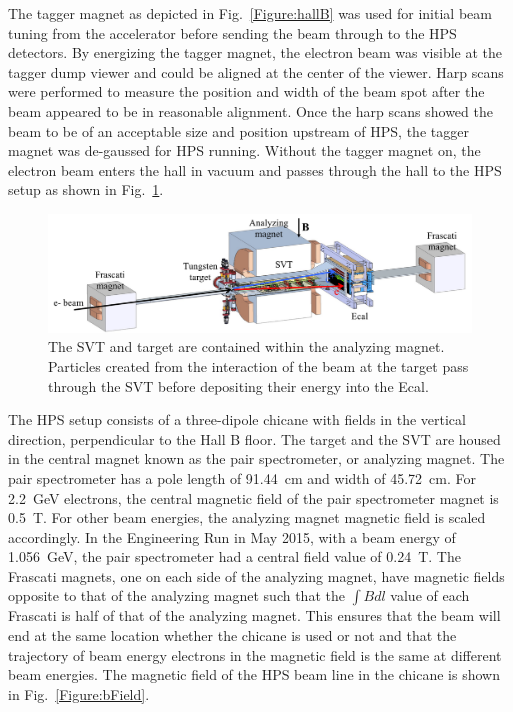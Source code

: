 \documentclass[12pt]{report}
\begin{document}
The tagger magnet as depicted in Fig.~\ref{Figure:hallB} was used for initial beam tuning from the accelerator before sending the beam through to the HPS detectors. By energizing the tagger magnet, the electron beam was visible at the tagger dump viewer and could be aligned at the center of the viewer. Harp scans were performed to measure the position and width of the beam spot after the beam appeared to be in reasonable alignment. Once the harp scans showed the beam to be of an acceptable size and position upstream of HPS, the tagger magnet was de-gaussed for HPS running. Without the tagger magnet on, the electron beam enters the hall in vacuum and passes through the hall to the HPS setup as shown in Fig.~\ref{Figure:hpsBeamline}. 

\begin{figure}[H]
  \centering
      \includegraphics[width=1.0\textwidth]{pics/experiment/hpsBeamline.png}
  \caption[HPS beamline]{The SVT and target are contained within the analyzing magnet. Particles created from the interaction of the beam at the target pass through the SVT before depositing their energy into the Ecal.}
  \label{Figure:hpsBeamline}
\end{figure}

The HPS setup consists of a three-dipole chicane with fields in the vertical direction, perpendicular to the Hall B floor. The target and the SVT are housed in the central magnet known as the pair spectrometer, or analyzing magnet. The pair spectrometer has a pole length of 91.44~cm and width of 45.72~cm. For 2.2~GeV electrons, the central magnetic field of the pair spectrometer magnet is 0.5~T. For other beam energies, the analyzing magnet magnetic field is scaled accordingly. In the Engineering Run in May 2015, with a beam energy of 1.056~GeV, the pair spectrometer had a central field value of 0.24~T. The Frascati magnets, one on each side of the analyzing magnet, have magnetic fields opposite to that of the analyzing magnet such that the $\int B dl$ value of each Frascati is half of that of the analyzing magnet. This ensures that the beam will end at the same location whether the chicane is used or not and that the trajectory of beam energy electrons in the magnetic field is the same at different beam energies. The magnetic field of the HPS beam line in the chicane is shown in Fig.~\ref{Figure:bField}.
\end{document}
